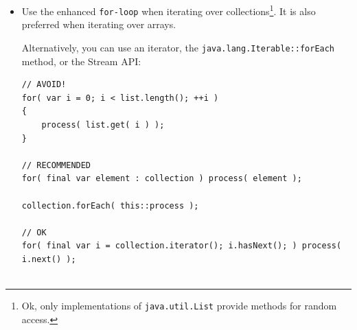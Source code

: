 \begin{itemize}
{For method arguments and return values, you should use the interfaces \lstinline|java.util.List|\autocite{ORACLE_DOC_LIST_INTERFACE} instead of \lstinline|Vector|, and \lstinline|java.util.Map|\autocite{ORACLE_DOC_MAP_INTERFACE} instead of \lstinline|Hashtable|. Refer also to chapter  that elaborates further on this topic.

If you need an implementation of the \lstinline|List| interface, you should prefer \lstinline|java.util.ArrayList|\autocite{ORACLE_DOC_ARRAYLIST_CLASS} over \lstinline|java.util.LinkedList|\autocite{ORACLE_DOC_LINKEDLIST_CLASS}. The latter is only more performant in some very rare cases, and it also has a bigger memory footprint\footnote{Internally, an \lstinline|ArrayList| uses an array for the entries, and when this gets too small, a new array with twice the size will be allocated. This means that for some time two large array will exist. For really, really large lists, this may cause an issue. In the opposite, a \lstinline|LinkedList| will grow entry by entry.}.

Instead of \lstinline|Hashtable|, you should use \lstinline|java.util.HashMap|\autocite{ORACLE_DOC_HASHMAP_CLASS} as the implementation for the \lstinline|Map| interface.

If you really need a synchronised list, you can still consider to use \lstinline|Vector| as your implementation of \lstinline|List|, but for a syncronised implementation of \lstinline|Map|, you should take \lstinline|java.util.concurrent.ConcurrentHashMap|\autocite{ORACLE_DOC_CONCURRENTHASHMAP_CLASS}.}

\item{Use the enhanced \lstinline|for-loop| when iterating over collections\footnote{Ok, only implementations of \lstinline|java.util.List|\autocite{ORACLE_DOC_LIST_INTERFACE} provide methods for random access.}. It is also preferred when iterating over arrays.

Alternatively, you can use an iterator, the \lstinline|java.lang.Iterable::forEach| method, or the Stream API:
\begin{lstlisting}
// AVOID!
for( var i = 0; i < list.length(); ++i )
{
    process( list.get( i ) );
}

// RECOMMENDED
for( final var element : collection ) process( element );

collection.forEach( this::process );

// OK
for( final var i = collection.iterator(); i.hasNext(); ) process( i.next() );


\end{lstlisting}}
\end{itemize}
